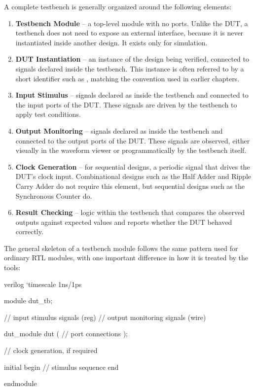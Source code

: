 A complete testbench is generally organized around the following elements:
\begin{enumerate}
	\item \textbf{Testbench Module} -- a top-level module with no ports. Unlike the DUT, a testbench does not need to expose an external interface, because it is never instantiated inside another design. It exists only for simulation.
	\item \textbf{DUT Instantiation} -- an instance of the design being verified, connected to signals declared inside the testbench. This instance is often referred to by a short identifier such as , matching the convention used in earlier chapters.
	\item \textbf{Input Stimulus} -- signals declared as  inside the testbench and connected to the input ports of the DUT. These signals are driven by the testbench to apply test conditions.
	\item \textbf{Output Monitoring} -- signals declared as  inside the testbench and connected to the output ports of the DUT. These signals are observed, either visually in the waveform viewer or programmatically by the testbench itself.
	\item \textbf{Clock Generation} -- for sequential designs, a periodic signal that drives the DUT's clock input. Combinational designs such as the Half Adder and Ripple Carry Adder do not require this element, but sequential designs such as the Synchronous Counter do.
	\item \textbf{Result Checking} -- logic within the testbench that compares the observed outputs against expected values and reports whether the DUT behaved correctly.
\end{enumerate}


The general skeleton of a testbench module follows the same pattern used for ordinary RTL modules, with one important difference in how it is treated by the tools:

\begin{codeblock}{verilog}
`timescale 1ns/1ps

module dut_tb;

    // input stimulus signals (reg)
    // output monitoring signals (wire)

    dut_module dut (
        // port connections
    );

    // clock generation, if required

    initial begin
        // stimulus sequence
    end

endmodule
\end{codeblock}

